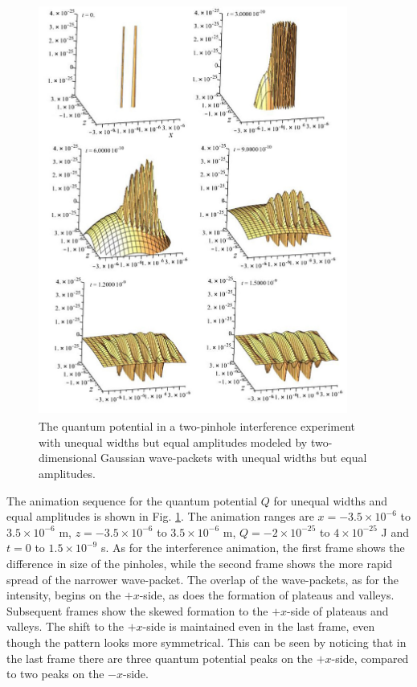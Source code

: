 \documentclass[12pt]{article}       %
\begin{document}
\begin{figure}[h]
\unitlength=1in
\hspace*{1.1in}\includegraphics[width=4in,height=5.33in]  {figure18.jpg}  
\caption{The quantum potential in a two-pinhole interference experiment with unequal widths but equal amplitudes modeled by two-dimensional Gaussian wave-packets with unequal widths but equal amplitudes.\label{QPAnimUW}}
\end{figure}
The animation sequence for the quantum potential $Q$ for unequal widths and equal amplitudes is shown in Fig.  \ref{QPAnimUW}. The animation ranges are  $x=-3.5\times 10^{-6}$ to $3.5\times 10^{-6}$ m, $z=-3.5\times 10^{-6}$ to $3.5\times 10^{-6}$ m, $Q=-2\times 10^{-25}$ to $4\times 10^{-25}$ J and $t=0$ to $1.5\times 10^{-9}$ s. As for the  interference animation, the first frame shows the difference in size of the pinholes, while the second frame shows the more  rapid spread of the narrower wave-packet. The overlap of the wave-packets, as for the intensity, begins on the $+x$-side, as does the formation of plateaus and valleys. Subsequent frames show the skewed formation to the $+x$-side of plateaus and valleys. The shift to the $+x$-side is maintained even in the last frame, even though the pattern looks more symmetrical. This can be seen by noticing that in the last frame there are three quantum potential peaks on the  $+x$-side, compared to two peaks on the $-x$-side.
\end{document}

